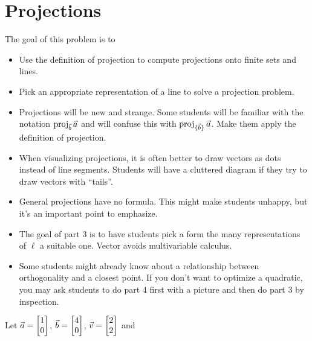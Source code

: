 \section*{Projections}


	\question
	\begin{annotation}
		\begin{goals}

			The goal of this problem is to
			\begin{itemize}
				\item Use the definition of projection to compute projections onto finite sets and lines.
				\item Pick an appropriate representation of a line to solve a projection problem.
			\end{itemize}
		\end{goals}
		\begin{notes}
			\begin{itemize}
				\item Projections will be new and strange. Some students will be familiar with
					the notation $\operatorname{proj}_{\vec b}\vec a$ and will confuse this
					with $\operatorname{proj}_{\{\vec b\}}\vec a$. Make them apply the definition of projection.
				\item When visualizing projections, it is often better to draw vectors as dots instead
					of line segments. Students will have a cluttered diagram if they try to
					draw vectors with ``tails''.
				\item General projections have no formula. This might make students unhappy, but it's an
					important point to emphasize.
				\item The goal of part 3 is to have students pick a form the many representations of $\ell$
					a suitable one. Vector avoids multivariable calculus.

				\item Some students might already know about a relationship between orthogonality and
					a closest point. If you don't want to optimize a quadratic,
					you may ask students to do part 4 first with a picture and then do part 3 by inspection.
			\end{itemize}
		\end{notes}
	\end{annotation}
	Let $\vec a=\mat{1\\0}$, $\vec b=\mat{4\\0}$, $\vec v=\mat{2\\2}$ and
